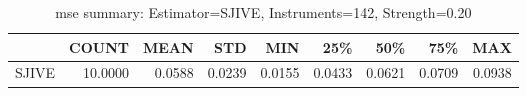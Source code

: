 \begin{table}[ht]
\centering
\caption{mse summary: Estimator=SJIVE, Instruments=142, Strength=0.20}
\begin{tabular}{lrrrrrrrr}
\toprule
 & COUNT & MEAN & STD & MIN & 25\% & 50\% & 75\% & MAX \\
\midrule
SJIVE & 10.0000 & 0.0588 & 0.0239 & 0.0155 & 0.0433 & 0.0621 & 0.0709 & 0.0938 \\
\bottomrule
\end{tabular}
\end{table}
